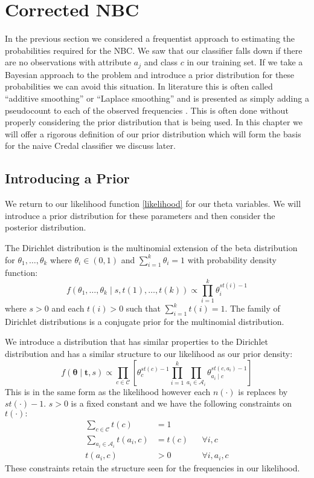 \chapter{Corrected NBC}

In the previous section we considered a frequentist approach to estimating the probabilities required for the NBC.
We saw that our classifier falls down if there are no observations with attribute $a_j$ and class $c$ in our training set.
If we take a Bayesian approach to the problem and introduce a prior distribution for these probabilities we can avoid this situation.
In literature this is often called ``additive smoothing'' or ``Laplace smoothing'' and is presented as simply adding a pseudocount to each of the observed frequencies \cite{Manning08}.
This is often done without properly considering the prior distribution that is being used.
In this chapter we will offer a rigorous definition of our prior distribution which will form the basis for the naive Credal classifier we discuss later.

\section{Introducing a Prior}

We return to our likelihood function \cref{likelihood} for our theta variables.
We will introduce a prior distribution for these parameters and then consider the posterior distribution.

The Dirichlet distribution is the multinomial extension of the beta distribution for $\theta_1,\dots,\theta_k$ where $\theta_i \in (0,1)$ and $\sum_{i=1}^k \theta_i = 1$ with probability density function:
\begin{equation} \label{dirichlet_pdf}
	f(\theta_1,\dots,\theta_k \mid s, t(1),\dots,t(k)) \propto \prod_{i=1}^k \theta_i^{st(i) - 1}
\end{equation}
where $s > 0$ and each $t(i)>0$ such that $\sum_{i=1}^{k}t(i) = 1$.
The family of Dirichlet distributions is a conjugate prior for the multinomial distribution.

We introduce a distribution that has similar properties to the Dirichlet distribution and has a similar structure to our likelihood as our prior density:
\begin{equation} \label{prior}
	f(\mathbf{\theta} \mid \mathbf{t}, s) \propto \prod_{c \in \mathcal{C}} \left[ \theta_c^{st(c) - 1} \prod_{i=1}^k \prod_{a_i \in \mathcal{A}_i} \theta_{a_i \mid c}^{st(c, a_i) - 1} \right]
\end{equation}
This is in the same form as the likelihood however each $n(\cdot)$ is replaces by $st(\cdot) - 1$.
$s > 0$ is a fixed constant and we have the following constraints on $t(\cdot):$
\begin{align}\label{prior_constraints}
	\sum_{c \in \mathcal{C}} t(c) & = 1 \\
	\sum_{a_i \in \mathcal{A}_i} t(a_i, c) & = t(c) && \forall i, c \\
	t(a_i, c) & > 0 && \forall i, a_i, c
\end{align}
These constraints retain the structure seen for the frequencies in our likelihood.

